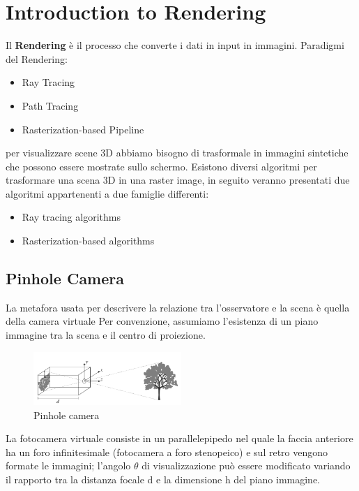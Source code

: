 \section{Introduction to Rendering}
Il \textbf{Rendering} è il processo che converte i dati in input in immagini.
Paradigmi del Rendering:
\begin{itemize}
    \item Ray Tracing
    \item Path Tracing
    \item Rasterization-based Pipeline
\end{itemize}
per visualizzare scene 3D abbiamo bisogno di trasformale in immagini sintetiche che possono essere mostrate sullo schermo.
Esistono diversi algoritmi per trasformare una scena 3D in una raster image, in seguito veranno presentati due algoritmi appartenenti a due famiglie differenti:
\begin{itemize}
    \item Ray tracing algorithms
    \item Rasterization-based algorithms
\end{itemize} 
\subsection{Pinhole Camera}
La metafora usata per descrivere la relazione tra l'osservatore e la scena è quella della camera virtuale
Per convenzione, assumiamo l'esistenza di un piano immagine tra la scena e il centro di proiezione.
\begin{figure}[H]
    \centering
    \includegraphics[width=0.5\textwidth]{images/PinHole.png} 
    \caption{Pinhole camera}
    \label{fig:immagine}
\end{figure}
La fotocamera virtuale consiste in un parallelepipedo nel quale la faccia anteriore ha un foro infinitesimale (fotocamera a foro stenopeico) e sul retro vengono formate le immagini; l'angolo $\theta$ di visualizzazione può essere modificato variando il rapporto tra la distanza focale d e la dimensione h del piano immagine.
